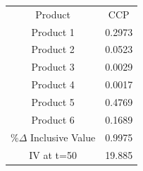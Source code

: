\begin{tabular}{cc}
Product & CCP \\
Product 1 & 0.2973 \\
Product 2 & 0.0523 \\
Product 3 & 0.0029 \\
Product 4 & 0.0017 \\
Product 5 & 0.4769 \\
Product 6 & 0.1689 \\
$\%\Delta$ Inclusive Value & 0.9975 \\
IV at t=50 & 19.885 \\
\end{tabular}